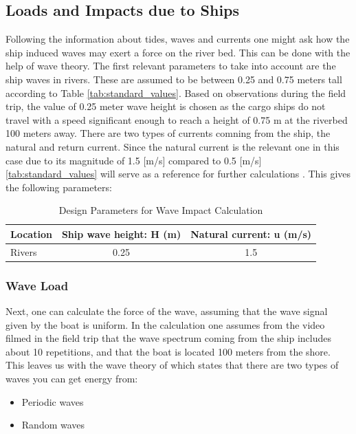 \subsection{Loads and Impacts due to Ships}
Following the information about tides, waves and currents one might ask how the ship induced waves may exert a force on the river bed. This can be done with the help of wave theory. The first relevant parameters to take into account are the ship waves in rivers. These are assumed to be between 0.25 and 0.75 meters tall according to Table \ref{tab:standard_values}. Based on observations during the field trip, the value of 0.25 meter wave height is chosen as the cargo ships do not travel with a speed significant enough to reach a height of 0.75 m at the riverbed 100 meters away.
There are two types of currents comning from the ship, the natural and return current. Since the natural current is the relevant one in this case due to its magnitude of 1.5 [m/s] compared to 0.5 [m/s] \ref{tab:standard_values} will serve as a reference for further calculations \autocite{hasanShipinducedWaveForces2025}.
This gives the following parameters:

\begin{table}[H]
    \centering
    \caption{Design Parameters for Wave Impact Calculation}
    \label{tab:Parameters for Wave Impact Calculation}
    \begin{tabular}{lcc}
        \toprule
        \textbf{Location} & \textbf{Ship wave height: H (m)} & \textbf{Natural current: u (m/s)} \\
        \midrule
        Rivers & 0.25 & 1.5 \\
        \bottomrule
    \end{tabular}
\end{table}

\subsubsection{Wave Load}
Next, one can calculate the force of the wave, assuming that the wave signal given by the boat is uniform. In the calculation one assumes from the video filmed in the field trip that the wave spectrum coming from the ship includes about 10 repetitions, and that the boat is located 100 meters from the shore. This leaves us with the wave theory of \autocite{arrigaLecture2CIEM40002025} which states that there are two types of waves you can get energy from:

\begin{itemize}
    \item Periodic waves 
    \item Random waves 
\end{itemize}

